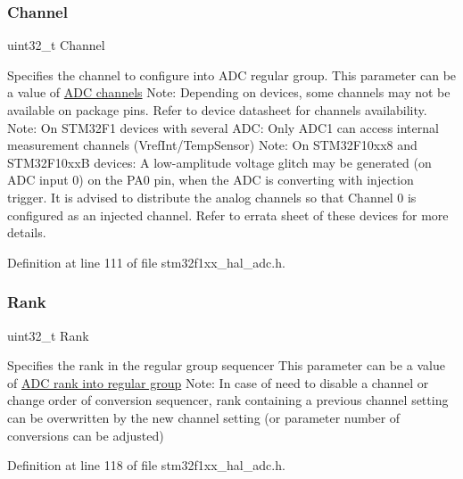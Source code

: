 \subsubsection{\texorpdfstring{Channel}{Channel}}
{\footnotesize\ttfamily uint32\+\_\+t Channel}

Specifies the channel to configure into A\+DC regular group. This parameter can be a value of \hyperlink{group___a_d_c__channels}{A\+DC channels} Note\+: Depending on devices, some channels may not be available on package pins. Refer to device datasheet for channels availability. Note\+: On S\+T\+M32\+F1 devices with several A\+DC\+: Only A\+D\+C1 can access internal measurement channels (Vref\+Int/\+Temp\+Sensor) Note\+: On S\+T\+M32\+F10xx8 and S\+T\+M32\+F10xxB devices\+: A low-\/amplitude voltage glitch may be generated (on A\+DC input 0) on the P\+A0 pin, when the A\+DC is converting with injection trigger. It is advised to distribute the analog channels so that Channel 0 is configured as an injected channel. Refer to errata sheet of these devices for more details. 

Definition at line 111 of file stm32f1xx\+\_\+hal\+\_\+adc.\+h.

\mbox{\label{struct_a_d_c___channel_conf_type_def_ab926cc2abe3d17aeaf637d499aef6b1b}} 
\subsubsection{\texorpdfstring{Rank}{Rank}}
{\footnotesize\ttfamily uint32\+\_\+t Rank}

Specifies the rank in the regular group sequencer This parameter can be a value of \hyperlink{group___a_d_c__regular__rank}{A\+DC rank into regular group} Note\+: In case of need to disable a channel or change order of conversion sequencer, rank containing a previous channel setting can be overwritten by the new channel setting (or parameter number of conversions can be adjusted) 

Definition at line 118 of file stm32f1xx\+\_\+hal\+\_\+adc.\+h.

\mbox{\label{struct_a_d_c___channel_conf_type_def_a72e649848c8a14f0adcba783cfb3b2cd}} 
